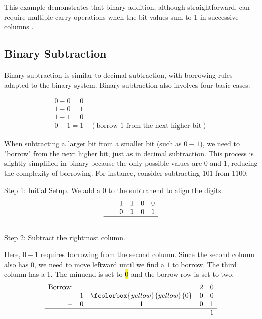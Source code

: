 This example demonstrates that binary addition, although straightforward, can require multiple carry operations when the bit values sum to 1 in successive columns \cite{knuth1997art}.

\subsection{Binary Subtraction}
Binary subtraction is similar to decimal subtraction, with borrowing rules adapted to the binary system. Binary subtraction also involves four basic cases:

\[
\begin{array}{l}
    0 - 0 = 0 \\
    1 - 0 = 1 \\
    1 - 1 = 0 \\
    0 - 1 = 1 \quad (\text{borrow 1 from the next higher bit})
\end{array}
\]

When subtracting a larger bit from a smaller bit (such as \( 0 - 1 \)), we need to "borrow" from the next higher bit, just as in decimal subtraction. This process is slightly simplified in binary because the only possible values are 0 and 1, reducing the complexity of borrowing. For instance, consider subtracting \( 101 \) from \( 1100 \):

Step 1: Initial Setup. We add a 0 to the subtrahend to align the digits.
\[
\begin{array}{rcccc}
    & 1 & 1 & 0 & 0 \\ %
  - & 0 & 1 & 0 & 1 \\ %
  \hline
    &   &   &   &   \\
\end{array}
\]

Step 2: Subtract the rightmost column.

Here, \(0 - 1\) requires borrowing from the second column. Since the second column also has \(0\), we need to move leftward until we find a \(1\) to borrow. The third column has a 1. The minuend is set to \colorbox{yellow}{0} and the borrow row is set to two.
\[
\begin{array}{rcccc}
    \text{Borrow:} &   &   & 2 & 0 \\ %
                   & 1 & \fcolorbox{yellow}{yellow}{0} & 0 & 0 \\ %
                 - & 0 & 1 & 0 & 1 \\ %
  \hline
                   &   &   &   & 1 \\ %
\end{array}
\]

